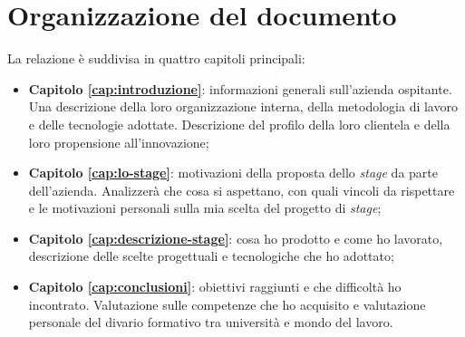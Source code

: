 \section*{Organizzazione del documento}
La relazione è suddivisa in quattro capitoli principali:
\begin{itemize}
    \item \textbf{Capitolo \ref{cap:introduzione}}: informazioni generali sull'azienda ospitante. Una descrizione della loro organizzazione interna, della metodologia di lavoro e delle tecnologie adottate. Descrizione del profilo della loro clientela e della loro propensione all'innovazione;
    \item \textbf{Capitolo \ref{cap:lo-stage}}: motivazioni della proposta dello \textit{stage} da parte dell'azienda. Analizzerà che cosa si aspettano, con quali vincoli da rispettare e le motivazioni personali sulla mia scelta del progetto di \textit{stage};
    \item \textbf{Capitolo \ref{cap:descrizione-stage}}: cosa ho prodotto e come ho lavorato, descrizione delle scelte progettuali e tecnologiche che ho adottato;
    \item \textbf{Capitolo \ref{cap:conclusioni}}: obiettivi raggiunti e che difficoltà ho incontrato. Valutazione sulle competenze che ho acquisito e valutazione personale del divario formativo tra università e mondo del lavoro.
\end{itemize}




\endgroup

\vfill
